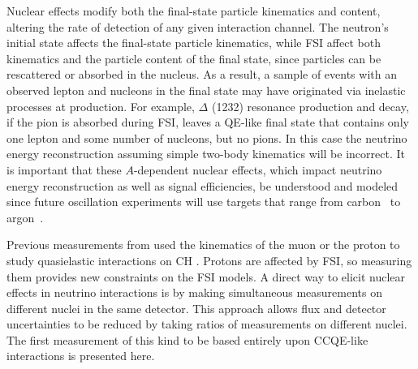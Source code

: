 Nuclear effects modify both the final-state particle kinematics and content, altering the rate of detection of any given interaction channel.
The neutron's initial state affects the final-state particle kinematics, while FSI affect both kinematics and the particle content of the final state, since particles can be rescattered or absorbed in the nucleus. As a result, a sample of events with an observed lepton and nucleons in the final state may have originated via inelastic processes at production. For example,  $\Delta$ (1232)  resonance  production  and  decay,  if the pion is absorbed during FSI, leaves a QE-like final state that contains only one lepton and some number of nucleons, but no pions. In this case the neutrino energy reconstruction assuming simple two-body kinematics will be incorrect.  It is important that these $A$-dependent nuclear effects, which impact neutrino energy reconstruction as well as signal efficiencies, be understood and modeled since future oscillation experiments will use targets that range from carbon~\cite{Adamson:2016tbq} to argon~\cite{Acciarri:2015uup}.

 Previous measurements from \minerva used the kinematics of the muon or the proton to study quasielastic interactions on CH \cite{PhysRevLett.111.022502,Walton:2014esl}. Protons are affected by FSI, so measuring them provides new constraints on the FSI models. A direct way to elicit nuclear effects in neutrino interactions is by making simultaneous measurements on different nuclei in the same detector. This approach allows flux and detector uncertainties to be reduced by taking ratios of measurements on different nuclei. The first measurement of this kind to be based entirely upon CCQE-like interactions is presented here.

